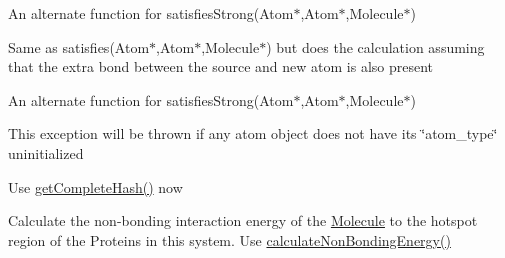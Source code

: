 \begin{DoxyRefList}
\label{deprecated__deprecated000004}%
%
An alternate function for satisfies\+Strong(\+Atom$\ast$,\+Atom$\ast$,\+Molecule$\ast$)  
\item[Member \mbox{\hyperlink{classchemtools_1_1Rule_a0cf5c642e583b5de8365542b343f673e}{chemtools\+::Rule\+::satisfies\+Strong}} (\mbox{\hyperlink{classAtom}{Atom}} $\ast$s, \mbox{\hyperlink{classAtom}{Atom}} $\ast$n, \mbox{\hyperlink{classMolecule}{Molecule}} $\ast$m) const]\label{deprecated__deprecated000003}%
%
Same as satisfies(\+Atom$\ast$,\+Atom$\ast$,\+Molecule$\ast$) but does the calculation assuming that the extra bond between the source and new atom is also present  
\item[Member \mbox{\hyperlink{classchemtools_1_1Rule_a061aeb5a392c810299374eb51f98bc37}{chemtools\+::Rule\+::satisfies\+Strong}} (\mbox{\hyperlink{classAtom}{Atom}} $\ast$s, \mbox{\hyperlink{classAtom}{Atom}} $\ast$n, const std\+::vector$<$ Atom $\ast$ $>$ \&b) const]\label{deprecated__deprecated000016}%
%
An alternate function for satisfies\+Strong(\+Atom$\ast$,\+Atom$\ast$,\+Molecule$\ast$)  
\item[Class \mbox{\hyperlink{classEmptyAtomTypeException}{Empty\+Atom\+Type\+Exception}} ]\label{deprecated__deprecated000025}%
%
This exception will be thrown if any atom object does not have it\textquotesingle{}s \char`\"{}atom\+\_\+type\char`\"{} uninitialized  
\item[Member \mbox{\hyperlink{classMolecule_a804447203e588ac312611688aa4fb500}{Molecule\+::get\+First\+Order\+Hash}} ()]\label{deprecated__deprecated000050}%
%
Use \mbox{\hyperlink{classMolecule_a9b7c224368ec15caea268e26051c9437}{get\+Complete\+Hash()}} now  
\item[Member \mbox{\hyperlink{classMolecule_a63283844d6c417b775c29fc9c86eef47}{Molecule\+::get\+Hotspot\+Energy}} (const \mbox{\hyperlink{classSystem}{System}} \&s, double v=0)]\label{deprecated__deprecated000047}%
%
Calculate the non-\/bonding interaction energy of the \mbox{\hyperlink{classMolecule}{Molecule}} to the hotspot region of the Proteins in this system. Use \mbox{\hyperlink{classMolecule_a973b1a0e85f2a3cf1e5c55dbe24c54e3}{calculate\+Non\+Bonding\+Energy()}}  
\item[Member \mbox{\hyperlink{classMolecule_a54571895bd7b4ffa483889aad3b1092b}{Molecule\+::hashatom}} (\mbox{\hyperlink{classAtom}{Atom}} $\ast$a)]\label{deprecated__deprecated000049}%

\end{DoxyRefList}
